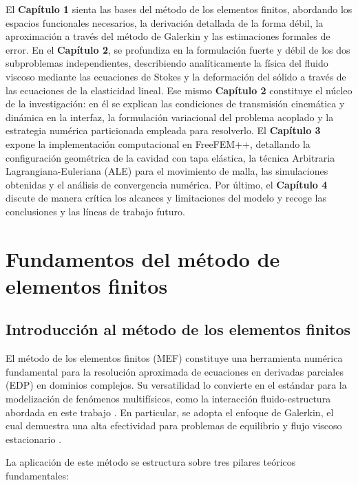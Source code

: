 \documentclass[12pt, letterpaper]{report}
\theoremstyle{definition}
\begin{document}
El \textbf{Capítulo 1} sienta las bases del método de los elementos finitos, abordando los espacios funcionales necesarios, la derivación detallada de la forma débil, la aproximación a través del método de Galerkin y las estimaciones formales de error. En el \textbf{Capítulo 2}, se profundiza en la formulación fuerte y débil de los dos subproblemas independientes, describiendo analíticamente la física del fluido viscoso mediante las ecuaciones de Stokes y la deformación del sólido a través de las ecuaciones de la elasticidad lineal. Ese mismo \textbf{Capítulo 2} constituye el núcleo de la investigación: en él se explican las condiciones de transmisión cinemática y dinámica en la interfaz, la formulación variacional del problema acoplado y la estrategia numérica particionada empleada para resolverlo. El \textbf{Capítulo 3} expone la implementación computacional en FreeFEM++, detallando la configuración geométrica de la cavidad con tapa elástica, la técnica Arbitraria Lagrangiana-Euleriana (ALE) para el movimiento de malla, las simulaciones obtenidas y el análisis de convergencia numérica. Por último, el \textbf{Capítulo 4} discute de manera crítica los alcances y limitaciones del modelo y recoge las conclusiones y las líneas de trabajo futuro.

\chapter{Fundamentos del método de elementos finitos}
\label{chap:teoria}

\section{Introducción al método de los elementos finitos}

El método de los elementos finitos (MEF) constituye una herramienta numérica fundamental para la resolución aproximada de ecuaciones en derivadas parciales (EDP) en dominios complejos. Su versatilidad lo convierte en el estándar para la modelización de fenómenos multifísicos, como la interacción fluido-estructura abordada en este trabajo \cite{hou2012numerical, bungartz2006fluid, kolahdouz2023sharp}. En particular, se adopta el enfoque de Galerkin, el cual demuestra una alta efectividad para problemas de equilibrio y flujo viscoso estacionario \cite{quarteroni2008numerical}.

La aplicación de este método se estructura sobre tres pilares teóricos fundamentales:
\end{document}
